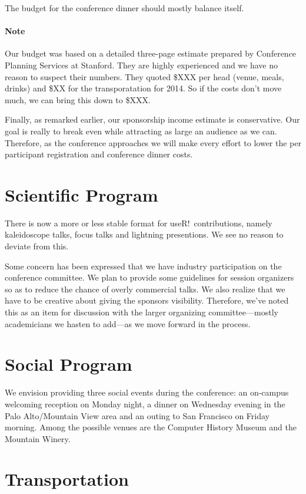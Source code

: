 \documentclass[11pt]{article}
\begin{document}
The budget for the conference dinner should mostly balance itself.

\paragraph{Note}
Our budget was based on a detailed three-page estimate prepared by
Conference Planning Services at Stanford. They are highly experienced
and we have no reason to suspect their numbers. They quoted \$XXX per
head (venue, meals, drinks) and \$XX for the transporatation for
2014. So if the costs don't move much, we can bring this down to
\$XXX.

Finally, as remarked earlier, our sponsorship income estimate is
conservative. Our goal is really to break even while attracting as
large an audience as we can. Therefore, as the conference approaches
we will make every effort to lower the per participant registration
and conference dinner costs.

\section*{Scientific Program}

There is now a more or less stable format for useR!~contributions,
namely kaleidoscope talks, focus talks and lightning
presentions. We see no reason to deviate from this.

Some concern has been expressed that we have industry participation on
the conference committee. We plan to provide some guidelines for
session organizers so as to reduce the chance of overly commercial
talks. We also realize that we have to be creative about giving the
sponsors visibility. Therefore, we've noted this as an item for
discussion with the larger organizing committee---mostly academicians
we hasten to add---as we move forward in the process.

\section*{Social Program}
We envision providing three social events during the conference: an
on-campus welcoming reception on Monday night, a dinner on Wednesday
evening in the Palo Alto/Mountain View area and an outing to San
Francisco on Friday morning. Among the possible venues are the
Computer History Museum and the Mountain Winery.

\section*{Transportation}
\end{document}
